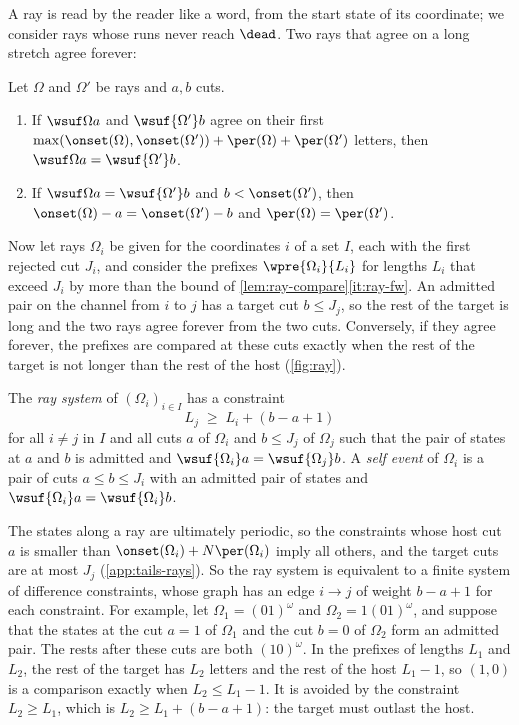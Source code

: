A ray is read by the reader like a word, from the start state of its
coordinate; we consider rays whose runs never reach $\dead$. Two rays that
agree on a long stretch agree forever:

\begin{lemma}\label{lem:ray-compare}
Let $\Omega$ and $\Omega'$ be rays and $a,b$ cuts.
\begin{enumerate}
\item\label{it:ray-fw} If $\wsuf\Omega a$ and $\wsuf{\Omega'}b$ agree on
  their first $\max(\onset(\Omega),\onset(\Omega'))+\per(\Omega)+
  \per(\Omega')$ letters, then $\wsuf\Omega a=\wsuf{\Omega'}b$.
\item\label{it:ray-onset} If $\wsuf\Omega a=\wsuf{\Omega'}b$ and
  $b<\onset(\Omega')$, then $\onset(\Omega)-a=\onset(\Omega')-b$ and
  $\per(\Omega)=\per(\Omega')$.
\end{enumerate}
\end{lemma}

Now let rays $\Omega_i$ be given for the coordinates $i$ of a set $I$, each
with the first rejected cut $J_i$, and consider the prefixes
$\wpre{\Omega_i}{L_i}$ for lengths $L_i$ that exceed $J_i$ by more than the
bound of \cref{lem:ray-compare}\eqref{it:ray-fw}. An admitted pair on the
channel from $i$ to $j$ has a target cut $b\le J_j$, so the rest of the
target is long and the two rays agree forever from the two cuts. Conversely,
if they agree forever, the prefixes are compared at these cuts exactly when
the rest of the target is not longer than the rest of the host
(\cref{fig:ray}).

\begin{definition}\label{def:ray-system}
The \emph{ray system} of $(\Omega_i)_{i\in I}$ has a constraint
\[
  L_j\;\ge\;L_i+(b-a+1)
\]
for all $i\ne j$ in $I$ and all cuts $a$ of $\Omega_i$ and $b\le J_j$ of
$\Omega_j$ such that the pair of states at $a$ and $b$ is admitted and
$\wsuf{\Omega_i}a=\wsuf{\Omega_j}b$. A \emph{self event} of $\Omega_i$ is a
pair of cuts $a\le b\le J_i$ with an admitted pair of states and
$\wsuf{\Omega_i}a=\wsuf{\Omega_i}b$.
\end{definition}

The states along a ray are ultimately periodic, so the constraints whose host
cut $a$ is smaller than $\onset(\Omega_i)+N\per(\Omega_i)$ imply all others,
and the target cuts are at most $J_j$ (\cref{app:tails-rays}). So the ray
system is equivalent to a finite system of difference constraints, whose
graph has an edge $i\to j$ of weight $b-a+1$ for each constraint. For
example, let $\Omega_1=(01)^\omega$ and $\Omega_2=1(01)^\omega$, and suppose
that the states at the cut $a=1$ of $\Omega_1$ and the cut $b=0$ of
$\Omega_2$ form an admitted pair. The rests after these cuts are both
$(10)^\omega$. In the prefixes of lengths $L_1$ and $L_2$, the rest of the
target has $L_2$ letters and the rest of the host $L_1-1$, so $(1,0)$ is a
comparison exactly when $L_2\le L_1-1$. It is avoided by the constraint
$L_2\ge L_1$, which is $L_2\ge L_1+(b-a+1)$: the target must outlast the
host.

